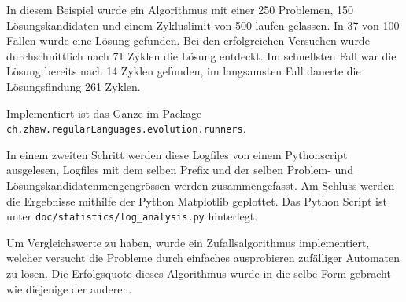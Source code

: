 In diesem Beispiel wurde ein Algorithmus mit einer 250 Problemen, 150 Lösungskandidaten und einem Zykluslimit von 500 laufen gelassen. In 37 von 100 Fällen wurde eine Lösung gefunden. Bei den erfolgreichen Versuchen wurde durchschnittlich nach 71 Zyklen die Lösung entdeckt. Im schnellsten Fall war die Lösung bereits nach 14 Zyklen gefunden, im langsamsten Fall dauerte die Lösungsfindung 261 Zyklen.

Implementiert ist das Ganze im Package \lstinline$ch.zhaw.regularLanguages.evolution.runners$.

In einem zweiten Schritt werden diese Logfiles von einem Pythonscript ausgelesen, Logfiles mit dem selben Prefix und der selben Problem- und Lösungskandidatenmengengrössen werden zusammengefasst. Am Schluss werden die Ergebnisse mithilfe der Python Matplotlib \cite{matplotlib} geplottet. Das Python Script ist unter \lstinline$doc/statistics/log_analysis.py$ hinterlegt.

Um Vergleichswerte zu haben, wurde ein Zufallsalgorithmus implementiert, welcher versucht die Probleme durch einfaches ausprobieren zufälliger Automaten zu lösen. Die Erfolgsquote dieses Algorithmus wurde in die selbe Form gebracht wie diejenige der anderen.